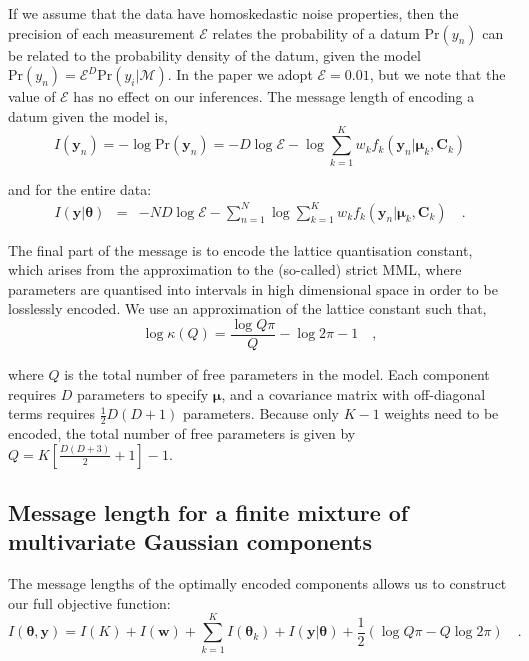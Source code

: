 \documentclass{article}
\newcommand{\vect}[1]{\boldsymbol{\mathbf{#1}}}
\def\veccov{\vect{C}}
\def\vecmean{\vect{\mu}}
\def\vectheta{\vect{\theta}}
\def\weight{w}
\def\weights{\vect{\weight}}
\def\datum{y}
\def\data{\vect{\datum}}
\begin{document}
If we assume that the data have homoskedastic noise properties, then the 
precision of each measurement $\mathcal{E}$ relates the probability of a
datum $\textrm{Pr}(\datum_n)$ can be related to the probability density of
the datum, given the model 
$\textrm{Pr}(\datum_n) = \mathcal{E}^{D}\textrm{Pr}(y_i|\mathcal{M})$.
In the paper we adopt $\mathcal{E} = 0.01$, but we note that the value of
$\mathcal{E}$ has no effect on our inferences.  The message length of encoding
a datum given the model is,
\begin{equation}
  I(\data_n) = -\log{\textrm{Pr}(\data_n)} = -D\log\mathcal{E} - \log\sum_{k=1}^{K}\weight_{k}f_{k}(\data_n|\vecmean_k,\veccov_k)
\end{equation}

\noindent{}and for the entire data:
\begin{eqnarray}
  I(\data|\vectheta) &=& -ND\log\mathcal{E} - \sum_{n=1}^{N}\log\sum_{k=1}^{K}w_{k}f_k(\data_n|\vecmean_k,\veccov_k) \quad .
\end{eqnarray}

The final part of the message is to encode the lattice quantisation constant,
which arises from the approximation to the (so-called) strict MML, where
parameters are quantised into intervals in high dimensional space in order to
be losslessly encoded.  We use an approximation of the lattice constant
\citep[see Sections 5.1.12 and 3.3.4 of ][]{Wallace_2005} such that,
\begin{equation}
  \log\kappa(Q) = \frac{\log{Q\pi}}{Q} - \log{2\pi} - 1 \quad ,
\end{equation}

\noindent{}where $Q$ is the total number of free parameters in the model. Each
component requires $D$ parameters to specify $\vecmean$, and a covariance
matrix with off-diagonal terms requires $\frac{1}{2}D(D+1)$ parameters.
Because only $K - 1$ weights need to be encoded, the total number of free
parameters is given by ${Q = K\left[\frac{D(D+3)}{2} + 1\right] - 1}$.


\subsection{Message length for a finite mixture of multivariate Gaussian components}

The message lengths of the optimally encoded components allows us to construct
our full objective function:
\begin{equation}
  I(\vectheta,\data) = I(K) + I(\weights) + \sum_{k=1}^{K}I(\vectheta_k) + I(\data|\vectheta) + \frac{1}{2}\left(\log{Q\pi} - Q\log{2\pi}\right)\quad .
\end{equation}
\end{document}
